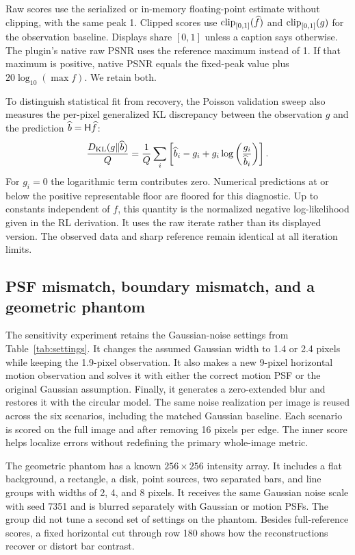 Raw scores use the serialized or in-memory floating-point estimate without clipping, with the same peak 1. Clipped scores use \(\operatorname{clip}_{[0,1]}(\widehat f)\) and \(\operatorname{clip}_{[0,1]}(g)\) for the observation baseline. Displays share \([0,1]\) unless a caption says otherwise. The plugin's native raw PSNR uses the reference maximum instead of 1. If that maximum is positive, native PSNR equals the fixed-peak value plus \(20\log_{10}(\max f)\). We retain both.

To distinguish statistical fit from recovery, the Poisson validation sweep also measures the per-pixel generalized KL discrepancy between the observation \(g\) and the prediction \(\widehat b=\mathsf H\widehat f\):
\begin{equation}
\frac{D_{\mathrm{KL}}(g\Vert\widehat b)}{Q} =
\frac1Q\sum_i\left[\widehat b_i-g_i+
 g_i\log\left(\frac{g_i}{\widehat b_i}\right)\right].
\label{eq:kl}
\end{equation}
For \(g_i=0\) the logarithmic term contributes zero. Numerical predictions at or below the positive representable floor are floored for this diagnostic. Up to constants independent of \(f\), this quantity is the normalized negative log-likelihood given in the RL derivation. It uses the raw iterate rather than its displayed version. The observed data and sharp reference remain identical at all iteration limits.

\subsection{PSF mismatch, boundary mismatch, and a geometric phantom}

The sensitivity experiment retains the Gaussian-noise settings from Table~\ref{tab:settings}. It changes the assumed Gaussian width to 1.4 or 2.4 pixels while keeping the 1.9-pixel observation. It also makes a new 9-pixel horizontal motion observation and solves it with either the correct motion PSF or the original Gaussian assumption. Finally, it generates a zero-extended blur and restores it with the circular model. The same noise realization per image is reused across the six scenarios, including the matched Gaussian baseline. Each scenario is scored on the full image and after removing 16 pixels per edge. The inner score helps localize errors without redefining the primary whole-image metric.

The geometric phantom has a known \(256\times256\) intensity array. It includes a flat background, a rectangle, a disk, point sources, two separated bars, and line groups with widths of 2, 4, and 8 pixels. It receives the same Gaussian noise scale with seed 7351 and is blurred separately with Gaussian or motion PSFs. The group did not tune a second set of settings on the phantom. Besides full-reference scores, a fixed horizontal cut through row 180 shows how the reconstructions recover or distort bar contrast.

